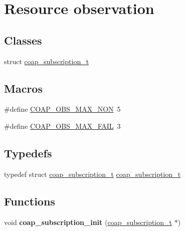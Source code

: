 \hypertarget{group__observe}{}\section{Resource observation}
\label{group__observe}
\subsection*{Classes}
\begin{DoxyCompactItemize}
\item 
struct \hyperlink{structcoap__subscription__t}{coap\+\_\+subscription\+\_\+t}
\end{DoxyCompactItemize}
\subsection*{Macros}
\begin{DoxyCompactItemize}
\item 
\#define \hyperlink{group__observe_ga823232351cb2bd203d2b34555f0c1d37}{C\+O\+A\+P\+\_\+\+O\+B\+S\+\_\+\+M\+A\+X\+\_\+\+N\+O\+N}~5
\item 
\#define \hyperlink{group__observe_gac0e2f9142cbad18a6a1989177fd0f5cb}{C\+O\+A\+P\+\_\+\+O\+B\+S\+\_\+\+M\+A\+X\+\_\+\+F\+A\+I\+L}~3
\end{DoxyCompactItemize}
\subsection*{Typedefs}
\begin{DoxyCompactItemize}
\item 
typedef struct \hyperlink{structcoap__subscription__t}{coap\+\_\+subscription\+\_\+t} \hyperlink{group__observe_ga88f00cd2b5e1b336f1ab634eb01c8b42}{coap\+\_\+subscription\+\_\+t}
\end{DoxyCompactItemize}
\subsection*{Functions}
\begin{DoxyCompactItemize}
\item 
\hypertarget{group__observe_gaa5db7653f7503be4810d593c5b61ed90}{}void {\bfseries coap\+\_\+subscription\+\_\+init} (\hyperlink{structcoap__subscription__t}{coap\+\_\+subscription\+\_\+t} $\ast$)\label{group__observe_gaa5db7653f7503be4810d593c5b61ed90}

\end{DoxyCompactItemize}


